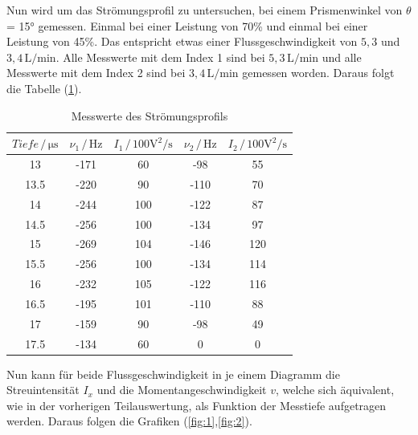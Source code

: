 \noindent
Nun wird um das Strömungsprofil zu untersuchen, bei einem Prismenwinkel von $\theta$ = 15° gemessen. Einmal bei einer Leistung von 70\% und einmal bei einer Leistung von 45\%.
Das entspricht etwas einer Flussgeschwindigkeit von $5,3$ und $3,4 \, \si{\liter\per\minute}$. Alle Messwerte mit dem Index 1 sind bei $5,3 \, \si{\liter\per\minute}$ und 
alle Messwerte mit dem Index 2 sind bei $3,4 \, \si{\liter\per\minute}$ gemessen worden. Daraus folgt die Tabelle (\ref{tab:profil}).

\begin{table}
    \centering
    \caption{Messwerte des Strömungsprofils}
    \begin{tabular}{c c c c c}
        \toprule

       {$Tiefe\, / \, \si{\micro\second}$} & {$\nu _1\, / \, \si{\hertz}$}& { $I_1 \, / \, 100\si{\volt\squared\per\second} $} & {$\nu_2 \, / \, \si{\hertz}$} & {$I_2 \, / \, 100\si{\volt\squared\per\second}$}\\
        \midrule
        13         &     -171    &        60   & -98   & 55  \\
        13.5       &     -220    &        90   & -110  & 70  \\
        14         &     -244    &        100  & -122  & 87  \\
        14.5       &     -256    &        100  & -134  & 97  \\
        15         &     -269    &        104  & -146  & 120  \\
        15.5       &     -256    &        100  & -134  & 114  \\
        16         &     -232    &        105  & -122  & 116  \\
        16.5       &     -195    &        101  & -110  & 88  \\
        17         &     -159    &        90   & -98    & 49  \\
        17.5       &     -134    &        60   & 0      & 0  \\
        \bottomrule
    \end{tabular}
    \label{tab:profil}
\end{table}

\noindent
Nun kann für beide Flussgeschwindigkeit in je einem Diagramm die Streuintensität $I_x$ und die Momentangeschwindigkeit $v$, welche sich äquivalent, wie in der vorherigen 
Teilauswertung, als Funktion der Messtiefe aufgetragen werden. Daraus folgen die Grafiken (\ref{fig:1},\ref{fig:2}).

